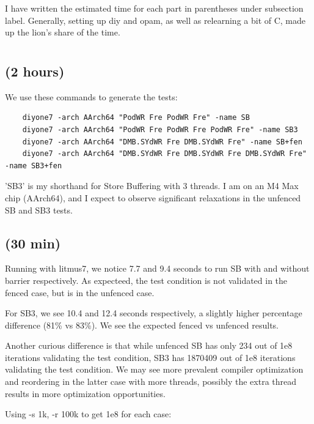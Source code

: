 I have written the estimated time for each part in parentheses under subsection label. Generally, setting up diy and opam, as well as relearning a bit of C, made up the lion's share of the time.

\section{} \label{}
\subsection{(2 hours)}
We use these commands to generate the tests:
\begin{lstlisting}
    diyone7 -arch AArch64 "PodWR Fre PodWR Fre" -name SB
    diyone7 -arch AArch64 "PodWR Fre PodWR Fre PodWR Fre" -name SB3    
    diyone7 -arch AArch64 "DMB.SYdWR Fre DMB.SYdWR Fre" -name SB+fen 
    diyone7 -arch AArch64 "DMB.SYdWR Fre DMB.SYdWR Fre DMB.SYdWR Fre" -name SB3+fen
\end{lstlisting}

'SB3' is my shorthand for Store Buffering with 3 threads. 
I am on an M4 Max chip (AArch64), and I expect to observe significant relaxations in the unfenced SB and SB3 tests.



\subsection{(30 min)}

Running with litmus7, we notice 7.7 and 9.4 seconds to run SB with and without barrier respectively. 
As expecteed, the test condition is not validated in the fenced case, but is in the unfenced case.

For SB3, we see 10.4 and 12.4 seconds respectively, a slightly higher percentage difference (81\% vs 83\%). 
We see the expected fenced vs unfenced results. 

Another curious difference is that while unfenced SB has only 234 out of 1e8 iterations validating the test condition, SB3 has 1870409 out of 1e8 iterations validating the test condition.
We may see more prevalent compiler optimization and reordering in the latter case with more threads, 
possibly the extra thread results in more optimization opportunities.

Using -s 1k, -r 100k to get 1e8 for each case:

